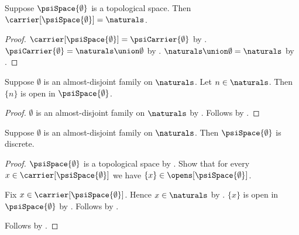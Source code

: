 \begin{proposition}\label{empty_psi_space_carrier}
    Suppose $\psiSpace{\emptyset}$ is a topological space.
    Then $\carrier[\psiSpace{\emptyset}]=\naturals$.
\end{proposition}
\begin{proof}
    $\carrier[\psiSpace{\emptyset}]=\psiCarrier{\emptyset}$ by
        .
    $\psiCarrier{\emptyset}=\naturals\union\emptyset$ by
        .
    $\naturals\union\emptyset=\naturals$ by .
\end{proof}

\begin{proposition}\label{empty_psi_every_natural_singleton_open}
    Suppose $\emptyset$ is an almost-disjoint family on
        $\naturals$.
    Let $n\in\naturals$.
    Then $\{n\}$ is open in $\psiSpace{\emptyset}$.
\end{proposition}
\begin{proof}
    $\emptyset$ is an almost-disjoint family on $\naturals$ by
        .
    Follows by .
\end{proof}

\begin{theorem}\label{empty_psi_space_is_discrete}
    Suppose $\emptyset$ is an almost-disjoint family on
        $\naturals$.
    Then $\psiSpace{\emptyset}$ is discrete.
\end{theorem}
\begin{proof}
    $\psiSpace{\emptyset}$ is a topological space by
        .
    Show that for every $x\in\carrier[\psiSpace{\emptyset}]$ we have
        $\{x\}\in\opens[\psiSpace{\emptyset}]$.
    \begin{subproof}
        Fix $x\in\carrier[\psiSpace{\emptyset}]$.
        Hence $x\in\naturals$ by .
        $\{x\}$ is open in $\psiSpace{\emptyset}$ by
            .
        Follows by .
    \end{subproof}
    Follows by .
\end{proof}

